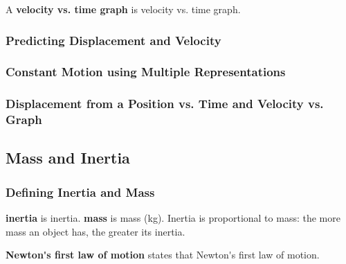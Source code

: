\documentclass[dvipsnames]{article}
\begin{document}
A \textbf{\gls{velocity vs. time graph}} is \glsdesc{velocity vs. time graph}.

\begin{center}
\end{center}

\subsubsection{Predicting Displacement and Velocity}

\subsubsection{Constant Motion using Multiple Representations}

\subsubsection{Displacement from a Position vs. Time and Velocity vs. Graph}

\subsection{Mass and Inertia}

\subsubsection{Defining Inertia and Mass}

\textbf{\Gls{inertia}} is \glsdesc{inertia}. \textbf{\Gls{mass}} is \glsdesc{mass} (kg). Inertia is proportional to mass: the more mass an object has, the greater its inertia. 

\textbf{\gls{Newton's first law of motion}} states that \glsdesc{Newton's first law of motion}.

\end{document}
